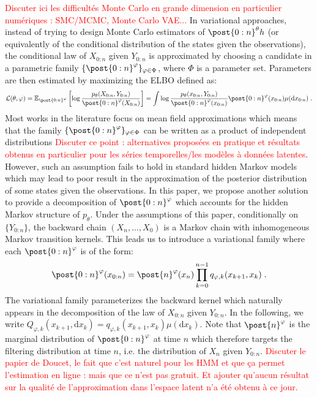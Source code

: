 \documentclass{article}
\newcommand{\1}{\mathbbm{1}}
\newcommand{\parvec}{\theta}
\def\pE{\mathbb{E}}
\newcommand{\rmd}{\ensuremath{\mathrm{d}}}
\newcommand{\eqsp}{\;}
\begin{document}
\textcolor{red}{Discuter ici les difficult\'es Monte Carlo en grande dimension en particulier num\'eriques : SMC/MCMC, Monte Carlo VAE...}
In variational approaches, instead of trying to design Monte Carlo estimators of $\post{0:n}^{\parvec} h$ (or equivalently of the conditional distribution of the states given the observations), the conditional law of $X_{0:n}$ given $Y_{0:n}$ is approximated by choosing a candidate in a parametric family $\{ \post{0:n}^{\varphi}\}_{\varphi \in \Phi}$, where $\Phi$ is a parameter set. Parameters are then estimated by maximizing the ELBO defined as:
$$
\mathcal{L}(\parvec,\varphi) = \pE_{ \post{0:n}^{\varphi}}\left[\log \frac{p_\parvec(X_{0:n},Y_{0:n})}{ \post{0:n}^{\varphi}(X_{0:n})}\right] = \int \log \frac{p_\parvec(x_{0:n},Y_{0:n})}{ \post{0:n}^{\varphi}(x_{0:n})} \post{0:n}^{\varphi}(x_{0:n})\mu(\rmd x_{0:n})\eqsp.
$$
Most works in the literature focus on mean field approximations which means that the family $\{ \post{0:n}^{\varphi}\}_{\varphi \in \Phi}$ can be written as a product of independent distributions \textcolor{red}{Discuter ce point : alternatives propos\'ees en pratique et r\'esultats obtenus en particulier pour les s\'eries temporelles/les mod\`eles \`a donn\'ees latentes}. However, such an assumption fails to hold in standard hidden Markov models which may lead to poor result in the approximation of the posterior distribution of some states given the observations. In this paper, we propose another solution to provide a decomposition of   $ \post{0:n}^{\varphi}$ which accounts for the hidden Markov structure of $p_\parvec$. Under the assumptions of this paper, conditionally on $\{Y_{0:n}\}$, the backward chain $(X_n,\ldots,X_0)$ is a Markov chain with inhomogeneous Markov transition kernels. This leads us to introduce a variational family where each $\post{0:n}^{\varphi}$ is of the form:
$$
 \post{0:n}^{\varphi}(x_{0:n})=  \post{n}^{\varphi}(x_n)\prod_{k=0}^{n-1}q_{\varphi,k}(x_{k+1},x_k)\eqsp.
$$
The variational family parameterizes the backward kernel which naturally appears in the decomposition of the law of $X_{0:n}$ given $Y_{0:n}$. In the following, we write $Q_{\varphi,k}(x_{k+1}, \rmd x_k) = q_{\varphi,k}(x_{k+1},x_k) \mu(\rmd x_k)$. Note that $ \post{n}^{\varphi}$ is the marginal distribution of $ \post{0:n}^{\varphi}$ at time $n$ which therefore targets the filtering distribution at time $n$, i.e. the distribution of $X_n$ given $Y_{0:n}$.
\textcolor{red}{Discuter le papier de Doucet, le fait que c'est naturel pour les HMM et que \c ca permet l'estimation en ligne : mais que ce n'est pas gratuit. Et ajouter qu'aucun r\'esultat sur la qualit\'e de l'approximation dans l'espace latent n'a \'et\'e obtenu \`a ce jour.}
\end{document}
